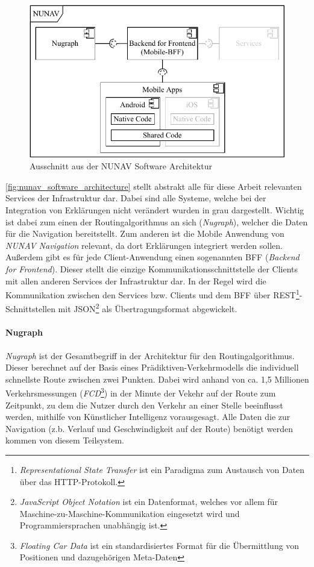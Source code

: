 \begin{figure}[bht!]
    \centering
    \includegraphics[width=\textwidth]{contents/06_model_evaluation/01_integration/res/nunav_architecture.pdf}
    \caption{Ausschnitt aus der NUNAV Software Architektur}
    \label{fig:nunav_software_architecture}
\end{figure}

\autoref{fig:nunav_software_architecture} stellt abstrakt alle für diese Arbeit relevanten Services der Infrastruktur dar. Dabei sind alle Systeme, welche bei der Integration von Erklärungen nicht verändert wurden in grau dargestellt. Wichtig ist dabei zum einen der Routingalgorithmus an sich (\textit{Nugraph}), welcher die Daten für die Navigation bereitstellt. Zum anderen ist die Mobile Anwendung von \textit{NUNAV Navigation} relevant, da dort Erklärungen integriert werden sollen. Außerdem gibt es für jede Client-Anwendung einen sogenannten BFF (\textit{Backend for Frontend}). Dieser stellt die einzige Kommunikationsschnittstelle der Clients mit allen anderen Services der Infrastruktur dar. In der Regel wird die Kommunikation zwischen den Services bzw. Clients und dem BFF über REST\footnote{\textit{Representational State Transfer} ist ein Paradigma zum Austausch von Daten über das HTTP-Protokoll.}-Schnittstellen mit JSON\footnote{\textit{JavaScript Object Notation} ist ein Datenformat, welches vor allem für Maschine-zu-Maschine-Kommunikation eingesetzt wird und Programmiersprachen unabhängig ist.} als Übertragungsformat abgewickelt. 

\paragraph{Nugraph} \textit{Nugraph} ist der Gesamtbegriff in der Architektur für den Routingalgorithmus. Dieser berechnet auf der Basis eines Prädiktiven-Verkehrmodells die individuell schnellste Route zwischen zwei Punkten. Dabei wird anhand von ca. 1,5 Millionen Verkehrsmessungen (\textit{FCD}\footnote{\textit{Floating Car Data} ist ein standardisiertes Format für die Übermittlung von Positionen und dazugehörigen Meta-Daten}) in der Minute der Vekehr auf der Route zum Zeitpunkt, zu dem die Nutzer durch den Verkehr an einer Stelle beeinflusst werden, mithilfe von Künstlicher Intelligenz vorausgesagt. Alle Daten die zur Navigation (z.b. Verlauf und Geschwindigkeit auf der Route) benötigt werden kommen von diesem Teilsystem.

